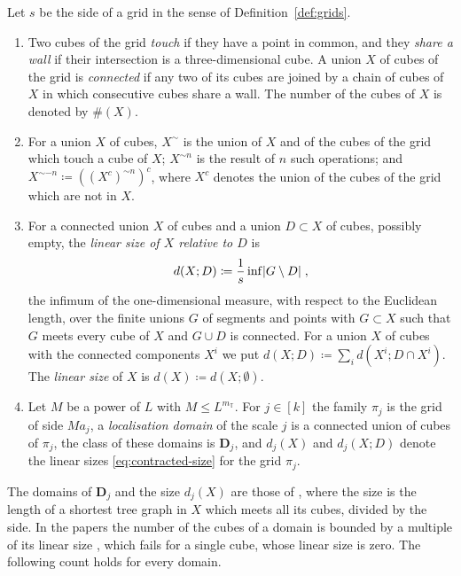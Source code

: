 \documentclass[11pt]{preprint}
\DeclarePairedDelimiter{\abs}{\lvert}{\rvert}
\numberwithin{equation}{section}
\begin{document}
\begin{definition}\label{def:localisation}
Let $s$ be the side of a grid in the sense of Definition~\ref{def:grids}.
\begin{enumerate}[label=(\roman*)]
\item Two cubes of the grid \emph{touch} if they have a point in common, and they \emph{share a wall} if their intersection is a three-dimensional cube. A union $X$ of cubes of the grid is \emph{connected} if any two of its cubes are joined by a chain of cubes of $X$ in which consecutive cubes share a wall. The number of the cubes of $X$ is denoted by $\#(X)$.
\item For a union $X$ of cubes, $X^\sim$ is the union of $X$ and of the cubes of the grid which touch a cube of $X$; $X^{\sim n}$ is the result of $n$ such operations; and $X^{\sim-n} \coloneqq ((X^c)^{\sim n})^c$, where $X^c$ denotes the union of the cubes of the grid which are not in $X$.
\item For a connected union $X$ of cubes and a union $D \subset X$ of cubes, possibly empty, the \emph{linear size of $X$ relative to $D$} is
\begin{equation}\label{eq:contracted-size}
    d(X; D) \coloneqq \frac{1}{s}\inf\abs{G \setminus D}\;,
\end{equation}
the infimum of the one-dimensional measure, with respect to the Euclidean length, over the finite unions $G$ of segments and points with $G \subset X$ such that $G$ meets every cube of $X$ and $G \cup D$ is connected. For a union $X$ of cubes with the connected components $X^i$ we put $d(X; D) \coloneqq \sum_id(X^i; D \cap X^i)$. The \emph{linear size} of $X$ is $d(X) \coloneqq d(X; \emptyset)$.
\item Let $M$ be a power of $L$ with $M \leqslant L^{m_{\mathbb T}}$. For $j \in [k]$ the family $\pi_j$ is the grid of side $Ma_j$, a \emph{localisation domain} of the scale $j$ is a connected union of cubes of $\pi_j$, the class of these domains is $\mathbf D_j$, and $d_j(X)$ and $d_j(X; D)$ denote the linear sizes \eqref{eq:contracted-size} for the grid $\pi_j$.
\end{enumerate}
\end{definition}

The domains of $\mathbf D_j$ and the size $d_j(X)$ are those of \cite[p.~257]{BalabanRG1}, where the size is the length of a shortest tree graph in $X$ which meets all its cubes, divided by the side. In the papers the number of the cubes of a domain is bounded by a multiple of its linear size \cite[(1.28), p.~8]{BalabanRG2}, which fails for a single cube, whose linear size is zero. The following count holds for every domain.
\end{document}
